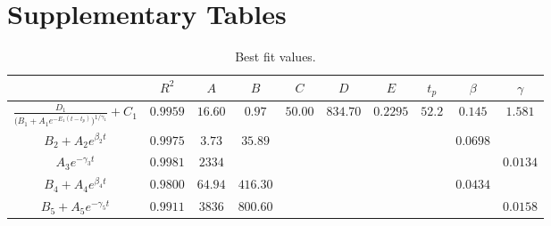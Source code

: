 \documentclass[fleqn,10pt]{wlscirep_SI}
\begin{document}
% 
%
% 
\section*{Supplementary Tables}

% 
%
\begin{table}[H]
\centering
\begin{tabular}[t]{ c c c c c c c c c c}
\toprule
&$R^2$&$A$&$B$&$C$&$D$&$E$&$t_p$&$\beta$&$\gamma$\\
\midrule
$\frac{D_1}{\big(B_1 + A_1 e^{-E_1 (t-t_p)}\big)^{1/\gamma_1} } + C_1$ 
& $0.9959$ & $16.60$ & $0.97$ & $50.00$ & $834.70$ & $0.2295$ & $52.2$  & $0.145$ & $1.581$\\
$B_2 + A_2 e^{\beta_2 t}$ & $0.9975$ & $3.73$ & $35.89$ & & & & &  $0.0698$ \\
$A_3 e^{-\gamma_3 t}$ & $0.9981$ & $2334$ & & & & & & &  $0.0134$ \\


$B_4 + A_4 e^{\beta_4 t}$ & $0.9800$ & $64.94$ & $416.30$ & & & & &  $0.0434$ \\


$B_5 + A_5 e^{-\gamma_5 t}$ & $0.9911$ & $3836$ & $800.60$ & & & & & &  $0.0158$ \\
\bottomrule
\end{tabular}
  \caption{Best fit values.}
  \label{Tab:table_bestfit}
\end{table}
\end{document}
